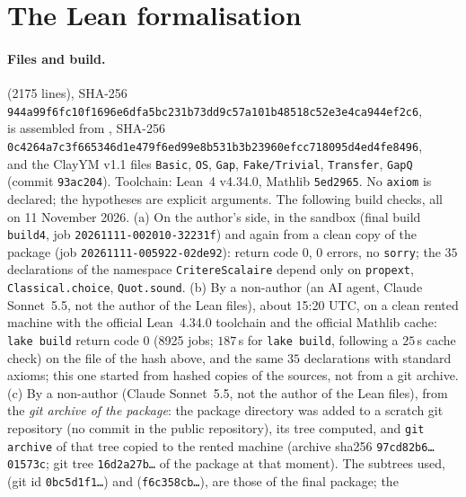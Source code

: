 \documentclass[11pt,a4paper]{article}
\theoremstyle{plain}
\theoremstyle{definition}
\theoremstyle{remark}
\numberwithin{equation}{section}
\newcommand{\REBUILDJOB}{20261111-005922-02de92}
\begin{document}
\section{The Lean formalisation}\label{app:lean}
\paragraph{Files and build.}  (2175 lines), SHA-256\\
{\footnotesize\texttt{944a99f6fc10f1696e6dfa5bc231b73dd9c57a101b48518c52e3e4ca944ef2c6}},\\
is assembled from , SHA-256\\
{\footnotesize\texttt{0c4264a7c3f665346d1e479f6ed99e8b531b3b23960efcc718095d4ed4fe8496}},\\
and the ClayYM v1.1 files \texttt{Basic}, \texttt{OS}, \texttt{Gap}, \texttt{Fake/Trivial}, \texttt{Transfer}, \texttt{GapQ} (commit
\texttt{93ac204}). Toolchain: Lean~4 v4.34.0, Mathlib \texttt{5ed2965}. No \texttt{axiom} is declared; the hypotheses are explicit arguments.
The following build checks, all on 11 November 2026. (a) On the author's side, in the sandbox (final build \texttt{build4}, job \texttt{20261111-002010-32231f}) and again
from a clean copy of the package (job \texttt{\REBUILDJOB}): return code $0$, $0$ errors, no \texttt{sorry}; the $35$ declarations of the namespace
\texttt{CritereScalaire} depend only on \texttt{propext}, \texttt{Classical.choice}, \texttt{Quot.sound}. (b) By a non-author (an AI agent, Claude
Sonnet~5.5, not the author of the Lean files), about 15:20 UTC, on a clean rented machine with the official Lean~4.34.0 toolchain and the
official Mathlib cache: \texttt{lake build} return code $0$ (8925 jobs; $187$\,s for \texttt{lake build}, following a $25$\,s cache check) on the file  of the hash above, and the same $35$
declarations with standard axioms; this one started from hashed copies of the sources, not from a git archive.
(c) By a non-author (Claude Sonnet~5.5, not the author of the Lean files), from the \emph{git archive of the package}: the package directory
 was added to a scratch git repository (no commit in the public repository), its tree computed, and
\texttt{git archive} of that tree copied to the rented machine (archive sha256 \texttt{97cd82b6\dots01573c}; git tree \texttt{16d2a27b\dots} of the package at
that moment). The subtrees used,  (git id \texttt{0bc5d1f1\dots}) and  (\texttt{f6c358cb\dots}), are those of the final package; the
\end{document}
